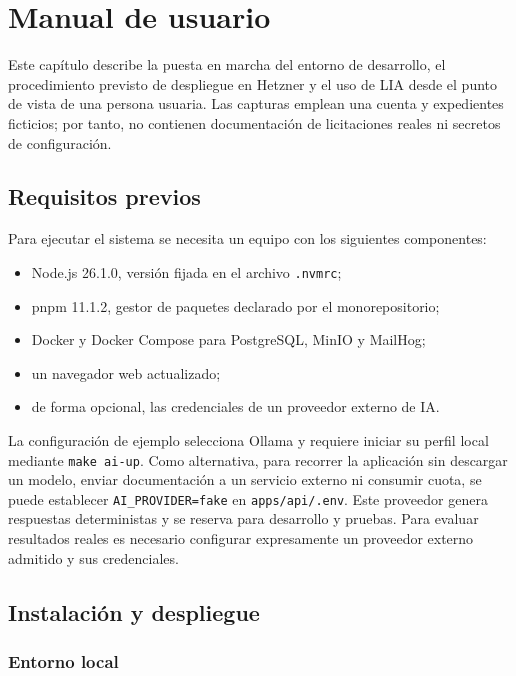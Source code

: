\chapter{Manual de usuario}
\label{chap:user-manual}

Este capítulo describe la puesta en marcha del entorno de desarrollo, el
procedimiento previsto de despliegue en Hetzner y el uso de LIA desde el punto de vista
de una persona usuaria. Las capturas emplean una cuenta y expedientes
ficticios; por tanto, no contienen documentación de licitaciones reales ni
secretos de configuración.

\section{Requisitos previos}

Para ejecutar el sistema se necesita un equipo con los siguientes componentes:

\begin{itemize}
  \item Node.js 26.1.0, versión fijada en el archivo \texttt{.nvmrc};
  \item pnpm 11.1.2, gestor de paquetes declarado por el monorepositorio;
  \item Docker y Docker Compose para PostgreSQL, MinIO y MailHog;
  \item un navegador web actualizado;
  \item de forma opcional, las credenciales de un proveedor externo de IA.
\end{itemize}

La configuración de ejemplo selecciona Ollama y requiere iniciar su perfil
local mediante \texttt{make ai-up}. Como alternativa, para recorrer la
aplicación sin descargar un modelo, enviar documentación a un servicio externo
ni consumir cuota, se puede establecer \texttt{AI\_PROVIDER=fake} en
\texttt{apps/api/.env}. Este proveedor genera respuestas deterministas y se
reserva para desarrollo y pruebas. Para evaluar resultados reales es necesario
configurar expresamente un proveedor externo admitido y sus credenciales.

\clearpage
\section{Instalación y despliegue}
\label{sec:user-manual-startup}

\subsection{Entorno local}

